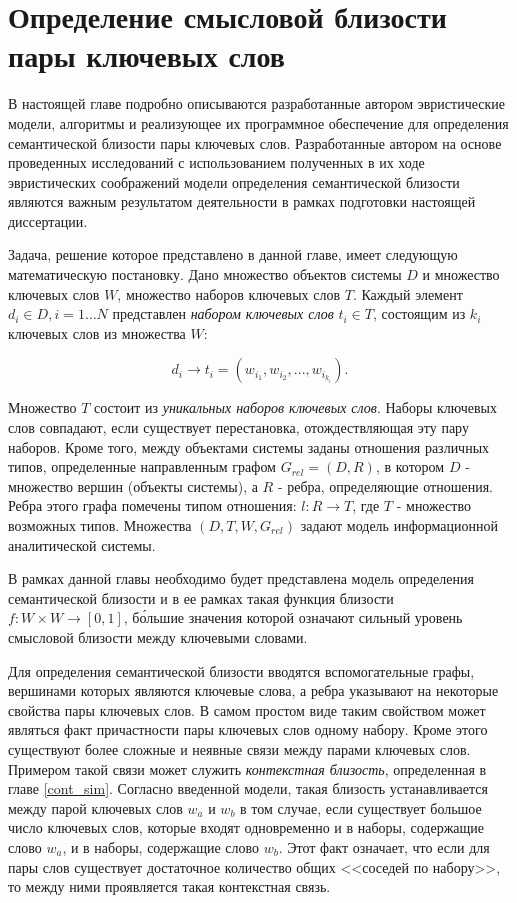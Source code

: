 \chapter{Определение смысловой близости пары ключевых слов} \label{chapt_word_similarity}
В настоящей главе подробно описываются разработанные автором эвристические модели, алгоритмы и реализующее их программное обеспечение для определения семантической близости пары ключевых слов. Разработанные автором на основе проведенных исследований с использованием полученных в их ходе эвристических соображений модели определения семантической близости являются важным результатом деятельности в рамках подготовки настоящей диссертации.

Задача, решение которое представлено в данной главе, имеет следующую математическую постановку. Дано множество объектов системы $D$ и множество ключевых слов $W$, множество наборов ключевых слов $T$. Каждый элемент $d_i \in D, i=1\ldots N$ представлен \emph{набором ключевых слов} $t_i \in T$, состоящим из  $k_i$ ключевых слов из множества $W$:

$$d_i\rightarrow t_i = (w_{i_1},w_{i_2},...,w_{i_{k_i}}).$$

Множество $T$ состоит из \emph{уникальных наборов ключевых слов}. Наборы ключевых слов совпадают, если существует перестановка, отождествляющая эту пару наборов. Кроме того, между объектами системы заданы отношения различных типов, определенные направленным графом $G_{rel} = (D, R)$, в котором $D$ - множество вершин (объекты системы), а $R$ - ребра, определяющие отношения. Ребра этого графа помечены типом отношения: $l: R \rightarrow T$, где $T$ - множество возможных типов.  Множества $(D, T, W, G_{rel})$ задают модель информационной аналитической системы.

В рамках данной главы необходимо будет представлена модель определения семантической близости и в ее рамках такая функция близости $f : W \times W \rightarrow [0, 1]$, б\'ольшие значения которой означают сильный уровень смысловой близости между ключевыми словами.

Для определения семантической близости вводятся вспомогательные графы, вершинами которых являются ключевые слова, а ребра указывают на некоторые свойства пары ключевых слов. В самом простом виде таким свойством может являться факт причастности пары ключевых слов одному набору. Кроме этого существуют более сложные и неявные связи между парами ключевых слов. Примером такой связи может служить \emph{контекстная близость}, определенная в главе \ref{cont_sim}. Согласно введенной модели, такая близость устанавливается между парой ключевых слов $w_a$ и $w_b$ в том случае, если существует большое число ключевых слов, которые входят одновременно и в наборы, содержащие слово $w_a$, и в наборы, содержащие слово $w_b$. Этот факт означает, что если для пары слов существует достаточное количество общих <<соседей по набору>>, то между ними проявляется такая контекстная связь.

